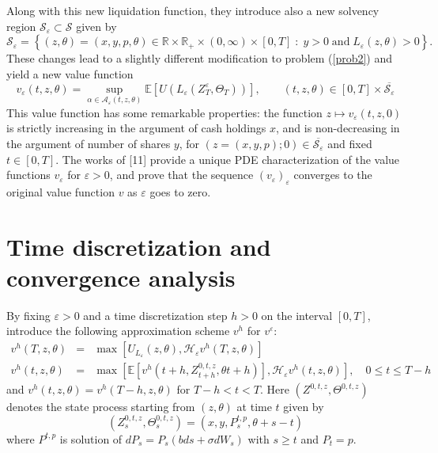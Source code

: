 \documentclass[a4paper,10pt]{article}
\newcommand{\bequ}{\begin{equation}}
\newcommand{\eequ}{\end{equation}}
\begin{document}
\par Along with this new liquidation function, they introduce also a new solvency region $\mathcal{S}_\varepsilon \subset \mathcal{S}$ given by
\[
\mathcal{S}_\varepsilon = \left\{(z, \theta) = (x, y, p, \theta) \in \mathbb{R}\times\mathbb{R}_+\times (0,\infty)\times [0, T] \; : \; y > 0 \; \textrm{and}\; L_{\varepsilon}(z,\theta) > 0\right\}.
\] 
These changes lead to a slightly different modification to problem (\ref{prob2}) and yield a new value function
\bequ
\label{prob3}
v_{\varepsilon}(t, z, \theta) = \sup\limits_{\alpha \in \mathcal{A}_\varepsilon (t,z,\theta)}\mathbb{E}\left[U\left(L_\varepsilon \left(Z^\varepsilon _T, \Theta_T\right)\right)\right], \qquad \left( {t,z,\theta } \right) \in \left[ {0,T} \right] \times \overline {\mathcal{S}_\varepsilon }
\eequ
This value function has some remarkable properties: the function $z \mapsto v_\varepsilon (t, z, 0)$ is strictly increasing in the argument of cash holdings $x$, and is non-decreasing in the argument of number of shares $y$, for $(z = (x, y, p); 0) \in \overline {\mathcal{S}_\varepsilon}$ and fixed $t \in [0, T]$. The works of [11] provide a unique PDE characterization of the value functions $v_\varepsilon$ for  $\varepsilon > 0$, and prove that the sequence $\left(v_\varepsilon\right)_\varepsilon$ converges to the original value function $v$ as $\varepsilon$ goes to zero.


\section{Time discretization and convergence analysis}
\par By fixing $\varepsilon > 0$ and a time discretization step $h > 0$ on the interval $[0, T]$, \cite{GMP} introduce the following approximation scheme $v^h$ for $v^\varepsilon$: 
\begin{eqnarray}
{v^{h}}(T,z,\theta ) &=& \max \left[ {{U_{L_\varepsilon }}\left( {z,\theta } \right),{\mathcal{H}_\varepsilon }{v^{h}}(T,z,\theta )} \right]
\label{3.3}
\\
{v^{h}}(t,z,\theta ) &=& \max \left[ {\mathbb{E}\left[ {{v^{h}}\left( {t + h,Z_{t + h}^{0,t,z},\theta t + h} \right)} \right],{\mathcal{H}_\varepsilon }{v^{h}}(t,z,\theta )} \right], \quad 0 \le t \le T - h
\label{3.4}
\end{eqnarray}
and $v^h (t,z,\theta) = v^h (T-h,z,\theta)$ for $T-h < t < T$. Here $\left( {{Z^{0,t,z}},{\Theta ^{0,t,z}}} \right)$ denotes the state process starting from $(z, \theta)$ at time $t$ given by
\[
\left( {Z_s^{0,t,z},\Theta _s^{0,t,z}} \right) = \left( {x,y,P_s^{t,p},\theta  + s - t} \right)
\]
where $P^{t,p}$ is solution of $dP_s = P_s\left(bds + \sigma dW_s\right)$ with $s \ge t$ and $P_t = p$. 
\end{document}
